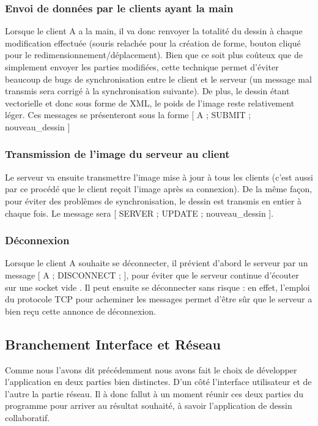 \documentclass[a4paper,11pt]{article}
\begin{document}
\subsubsection{Envoi de données par le clients ayant la main}
Lorsque le client A a la main, il va donc renvoyer la totalité du dessin à chaque modification effectuée (souris relachée pour la création de forme, bouton cliqué pour le redimensionnement/déplacement). Bien que ce soit plus coûteux que de simplement envoyer les parties modifiées, cette technique permet d'éviter beaucoup de bugs de synchronisation entre le client et le serveur (un message mal transmis sera corrigé à la synchronisation suivante). De plus, le dessin étant vectorielle et donc sous forme de XML, le poids de l'image reste relativement léger. Ces messages se présenteront sous la forme [ A ; SUBMIT ; nouveau\_dessin ]

\subsubsection{Transmission de l'image du serveur au client}
Le serveur va ensuite transmettre l'image mise à jour à tous les clients (c'est aussi par ce procédé que le client reçoit l'image après sa connexion). De la même façon, pour éviter des problèmes de synchronisation, le dessin est transmis en entier à chaque fois. Le message sera [ SERVER ; UPDATE ; nouveau\_dessin ].

\subsubsection{Déconnexion}
Lorsque le client A souhaite se déconnecter, il prévient d'abord le serveur par un message [ A ; DISCONNECT ; ], pour éviter que le serveur continue d'écouter sur une socket \og vide \fg. Il peut ensuite se déconnecter sans risque : en effet, l'emploi du protocole TCP pour acheminer les messages permet d'être sûr que le serveur a bien reçu cette annonce de déconnexion.

\subsection{Branchement Interface et Réseau}
Comme nous l'avons dit précédemment nous avons fait le choix de développer l'application en deux parties bien distinctes. D'un côté l'interface utilisateur et de l'autre la partie réseau. Il à donc fallut à un moment réunir ces deux parties du programme pour arriver au résultat souhaité, à savoir l'application de dessin collaboratif.
\end{document}
